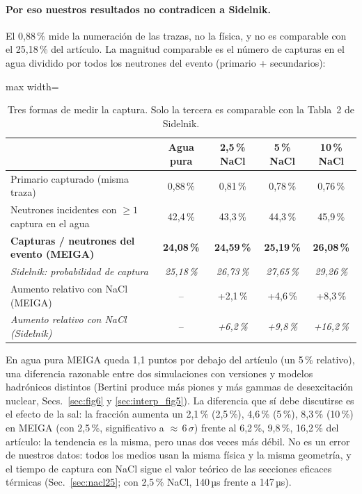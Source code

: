 \documentclass[11pt,a4paper]{article}
\begin{document}
\paragraph{Por eso nuestros resultados no contradicen a Sidelnik.} El 0,88\,\% mide la numeración de las trazas, no la física, y no es comparable con el 25,18\,\% del artículo.
La magnitud comparable es el número de capturas en el agua dividido por todos los neutrones del evento (primario + secundarios):
\begin{table}[H]\centering\small\begin{adjustbox}{max width=\linewidth}\begin{tabular}{lcccc}\toprule
 & Agua pura & 2,5\,\% NaCl & 5\,\% NaCl & 10\,\% NaCl \\\midrule
Primario capturado (misma traza) & 0,88\,\% & 0,81\,\% & 0,78\,\% & 0,76\,\% \\
Neutrones incidentes con $\geq 1$ captura en el agua & 42,4\,\% & 43,3\,\% & 44,3\,\% & 45,9\,\% \\
\textbf{Capturas / neutrones del evento (MEIGA)} & \textbf{24,08\,\%} & \textbf{24,59\,\%} & \textbf{25,19\,\%} & \textbf{26,08\,\%} \\
\textit{Sidelnik: probabilidad de captura} & \textit{25,18\,\%} & \textit{26,73\,\%} & \textit{27,65\,\%} & \textit{29,26\,\%} \\
Aumento relativo con NaCl (MEIGA) & -- & +2,1\,\% & +4,6\,\% & +8,3\,\% \\
\textit{Aumento relativo con NaCl (Sidelnik)} & -- & \textit{+6,2\,\%} & \textit{+9,8\,\%} & \textit{+16,2\,\%} \\
\bottomrule\end{tabular}\end{adjustbox}\caption{Tres formas de medir la captura. Solo la tercera es comparable con la Tabla~2 de Sidelnik.}\label{tab:defs_captura}\end{table}
En agua pura MEIGA queda 1,1 puntos por debajo del artículo (un 5\,\% relativo), una diferencia razonable entre dos simulaciones con versiones y modelos hadrónicos distintos
(Bertini produce más piones y más gammas de desexcitación nuclear, Secs.~\ref{sec:fig6} y \ref{sec:interp_fig5}).
La diferencia que sí debe discutirse es el efecto de la sal: la fracción aumenta un 2,1\,\% (2,5\,\%), 4,6\,\% (5\,\%), 8,3\,\% (10\,\%) en MEIGA (con 2,5\,\%, significativo a $\approx$\,6\,$\sigma$) frente al 6,2\,\%, 9,8\,\%, 16,2\,\% del artículo: la tendencia es la misma, pero unas dos veces más débil.
No es un error de nuestros datos: todos los medios usan la misma física y la misma geometría, y el tiempo de captura con NaCl sigue el valor teórico de las secciones eficaces térmicas (Sec.~\ref{sec:nacl25}; con 2,5\,\% NaCl, 140\,µs frente a 147\,µs).
\end{document}
